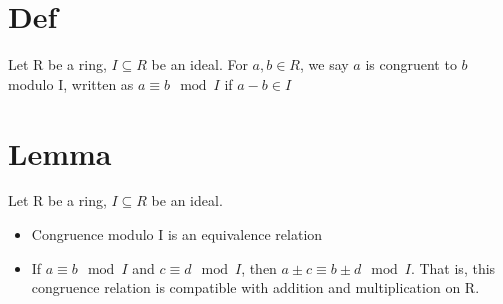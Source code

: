 \documentclass{book}
\begin{document}
\section{Def}
Let R be a ring, $I\subseteq R$ be an ideal. For $a,b\in R$, we say $a$ is congruent to $b$ modulo I, written as $a\equiv b\mod I$ if $a-b\in I$
\section{Lemma}
Let R be a ring, $I\subseteq R$ be an ideal.\begin{itemize}
	\item Congruence modulo I is an equivalence relation
	\item If $a\equiv b\mod I$ and $c\equiv d\mod I$, then $a\pm c\equiv b\pm d\mod I$. That is, this congruence relation is compatible with addition and multiplication on R.
\end{itemize}
\end{document}
